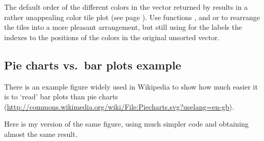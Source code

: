 \documentclass[krantz2]{krantz}\usepackage{knitr}%
\begin{document}
\begin{playground}
  The default order of the different colors in the vector returned by  results in a rather unappealing color tile plot (see page \pageref{chunk:plot:color:tiles}). Use functions ,  and  or  to rearrange the tiles into a more pleasant arrangement, but still using for the labels the indexes to the positions of the colors in the original unsorted vector.
\end{playground}

\subsection{Pie charts vs.\ bar plots example}\label{sec:plot:pie:bar}

\begin{knitrout}\footnotesize
{}\color{fgcolor}\begin{kframe}
\begin{alltt}
\hlopt{$}
\end{alltt}
\end{kframe}
\end{knitrout}

There is an example figure widely used in Wikipedia to show how much easier it is to `read' bar plots than pie charts (\url{http://commons.wikimedia.org/wiki/File:Piecharts.svg?uselang=en-gb}).

Here is my \ggplot version of the same figure, using much simpler code and obtaining almost the same result.
\end{document}
